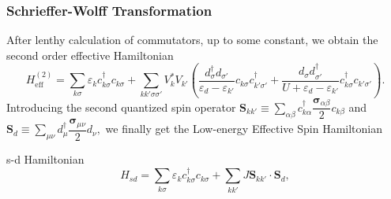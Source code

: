 \documentclass[10pt,aspectratio=43,xcolor=x11names]{beamer}%
\begin{document}
		\begin{frame}\frametitle{Schrieffer-Wolff Transformation}
			 After lenthy calculation of commutators, up to some constant, we obtain the second order effective Hamiltonian
			 \begin{equation*}
			 	H_{\text{eff}}^{(2)}=\sum_{k \sigma}\varepsilon_k c_{k \sigma}^\dagger c_{k \sigma}+\sum_{kk' \sigma\sigma'}V_k^*V_{k'}\left(\dfrac{d_\sigma^\dagger d_{\sigma'}}{\varepsilon_d- \varepsilon_{k'}}c_{k \sigma}c_{k'\sigma'}^\dagger+\dfrac{d_\sigma d_{\sigma'}^\dagger}{U+\varepsilon_d- \varepsilon_{k'}}c_{k \sigma}^\dagger c_{k'\sigma'}\right).
			 \end{equation*}
			 Introducing the second quantized spin operator $\bm{S}_{kk'}\equiv\sum_{\alpha \beta}c_{k \alpha}^\dagger\dfrac{\bm{\sigma}_{\alpha \beta}}{2}c_{k \beta}$ and $\bm{S}_d\equiv\sum_{\mu\nu}d_\mu^\dagger\dfrac{\bm{\sigma}_{\mu\nu}}{2}d_{\nu},$ we finally get the Low-energy Effective Spin Hamiltonian
			 \begin{greenblock}{s-d Hamiltonian}
			 	\begin{equation*}
			 		H_{sd}=\sum_{k \sigma}\varepsilon_k c_{k \sigma}^\dagger c_{k \sigma}+\sum_{kk'}J\bm{S}_{kk'}\cdot\bm{S}_d,
			 	\end{equation*}
			 \end{greenblock}
		\end{frame}
\end{document}
